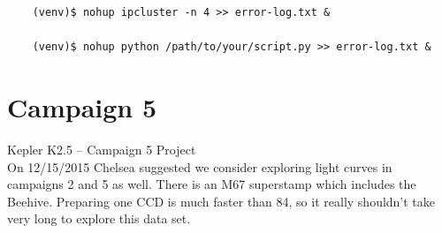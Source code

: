 \documentclass[11pt,letterpaper]{book} %
\begin{document}
\begin{verbatim}
    (venv)$ nohup ipcluster -n 4 >> error-log.txt &

    (venv)$ nohup python /path/to/your/script.py >> error-log.txt &
\end{verbatim}


\chapter*{Campaign 5}
{\Huge Kepler K2.5 -- Campaign 5 Project}\\[5mm]
On 12/15/2015 Chelsea suggested we consider exploring light curves in campaigns 2 and 5 as well. There is an M67 superstamp which includes the Beehive. 
Preparing one CCD is much faster than 84, so it really shouldn't take very long to explore this data set. 
\end{document}
